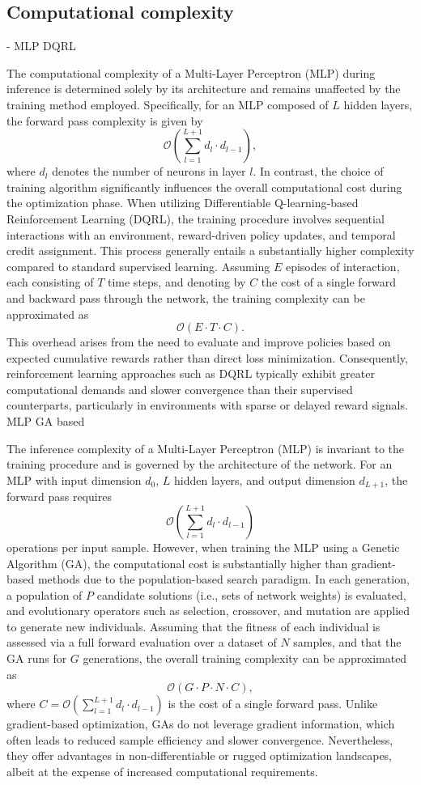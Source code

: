 \documentclass[preprint,12pt]{elsarticle}
\begin{document}
\subsection{Computational complexity}

- MLP DQRL

The computational complexity of a Multi-Layer Perceptron (MLP) during inference is determined solely by its architecture and remains unaffected by the training method employed. Specifically, for an MLP composed of \( L \) hidden layers, the forward pass complexity is given by
\[
\mathcal{O}\left( \sum_{l=1}^{L+1} d_l \cdot d_{l-1} \right),
\]
where \( d_l \) denotes the number of neurons in layer \( l \). In contrast, the choice of training algorithm significantly influences the overall computational cost during the optimization phase. When utilizing Differentiable Q-learning-based Reinforcement Learning (DQRL), the training procedure involves sequential interactions with an environment, reward-driven policy updates, and temporal credit assignment. This process generally entails a substantially higher complexity compared to standard supervised learning. Assuming \( E \) episodes of interaction, each consisting of \( T \) time steps, and denoting by \( C \) the cost of a single forward and backward pass through the network, the training complexity can be approximated as
\[
\mathcal{O}(E \cdot T \cdot C).
\]
This overhead arises from the need to evaluate and improve policies based on expected cumulative rewards rather than direct loss minimization. Consequently, reinforcement learning approaches such as DQRL typically exhibit greater computational demands and slower convergence than their supervised counterparts, particularly in environments with sparse or delayed reward signals.
 MLP GA based


The inference complexity of a Multi-Layer Perceptron (MLP) is invariant to the training procedure and is governed by the architecture of the network. For an MLP with input dimension \( d_0 \), \( L \) hidden layers, and output dimension \( d_{L+1} \), the forward pass requires
\[
\mathcal{O}\left( \sum_{l=1}^{L+1} d_l \cdot d_{l-1} \right)
\]
operations per input sample. However, when training the MLP using a Genetic Algorithm (GA), the computational cost is substantially higher than gradient-based methods due to the population-based search paradigm. In each generation, a population of \( P \) candidate solutions (i.e., sets of network weights) is evaluated, and evolutionary operators such as selection, crossover, and mutation are applied to generate new individuals. Assuming that the fitness of each individual is assessed via a full forward evaluation over a dataset of \( N \) samples, and that the GA runs for \( G \) generations, the overall training complexity can be approximated as
\[
\mathcal{O}(G \cdot P \cdot N \cdot C),
\]
where \( C = \mathcal{O}\left( \sum_{l=1}^{L+1} d_l \cdot d_{l-1} \right) \) is the cost of a single forward pass. Unlike gradient-based optimization, GAs do not leverage gradient information, which often leads to reduced sample efficiency and slower convergence. Nevertheless, they offer advantages in non-differentiable or rugged optimization landscapes, albeit at the expense of increased computational requirements.
\end{document}
